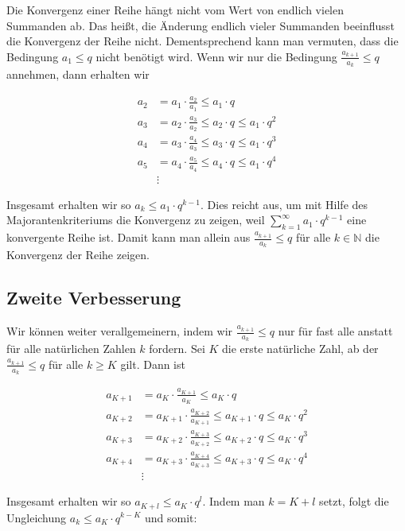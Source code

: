 \documentclass[fontsize=9pt,
               parskip=half-,
               DIV=14,
               listof=chapterentry,
               tocflat]{scrbook}
\begin{document}
Die Konvergenz einer Reihe hängt nicht vom Wert von endlich vielen Summanden ab. Das heißt, die Änderung endlich vieler Summanden beeinflusst die Konvergenz der Reihe nicht. Dementsprechend kann man vermuten, dass die Bedingung $a_{1}\leq q$ nicht benötigt wird. Wenn wir nur die Bedingung ${\tfrac {a_{k+1}}{a_{k}}}\leq q$ annehmen, dann erhalten wir

\begin{align*}
a_{2}&=a_{1}\cdot {\frac {a_{2}}{a_{1}}}\leq a_{1}\cdot q\\a_{3}&=a_{2}\cdot {\frac {a_{3}}{a_{2}}}\leq a_{2}\cdot q\leq a_{1}\cdot q^{2}\\a_{4}&=a_{3}\cdot {\frac {a_{4}}{a_{3}}}\leq a_{3}\cdot q\leq a_{1}\cdot q^{3}\\a_{5}&=a_{4}\cdot {\frac {a_{5}}{a_{4}}}\leq a_{4}\cdot q\leq a_{1}\cdot q^{4}\\&\vdots 
\end{align*}

Insgesamt erhalten wir so $a_{k}\leq a_{1}\cdot q^{k-1}$. Dies reicht aus, um mit Hilfe des Majorantenkriteriums die Konvergenz zu zeigen, weil $\sum _{k=1}^{\infty }a_{1}\cdot q^{k-1}$ eine konvergente Reihe ist. Damit kann man allein aus ${\frac {a_{k+1}}{a_{k}}}\leq q$ für alle $k\in \mathbb {N} $ die Konvergenz der Reihe zeigen.

\subsection{Zweite Verbesserung}

Wir können weiter verallgemeinern, indem wir ${\tfrac {a_{k+1}}{a_{k}}}\leq q$ nur für fast alle anstatt für alle natürlichen Zahlen $k$ fordern. Sei $K$ die erste natürliche Zahl, ab der ${\tfrac {a_{k+1}}{a_{k}}}\leq q$ für alle $k\geq K$ gilt. Dann ist

\begin{align*}
a_{K+1}&=a_{K}\cdot {\frac {a_{K+1}}{a_{K}}}\leq a_{K}\cdot q\\[0.5em]a_{K+2}&=a_{K+1}\cdot {\frac {a_{K+2}}{a_{K+1}}}\leq a_{K+1}\cdot q\leq a_{K}\cdot q^{2}\\[0.5em]a_{K+3}&=a_{K+2}\cdot {\frac {a_{K+3}}{a_{K+2}}}\leq a_{K+2}\cdot q\leq a_{K}\cdot q^{3}\\[0.5em]a_{K+4}&=a_{K+3}\cdot {\frac {a_{K+4}}{a_{K+3}}}\leq a_{K+3}\cdot q\leq a_{K}\cdot q^{4}\\[0.5em]&\vdots 
\end{align*}

Insgesamt erhalten wir so $a_{K+l}\leq a_{K}\cdot q^{l}$. Indem man $k=K+l$ setzt, folgt die Ungleichung $a_{k}\leq a_{K}\cdot q^{k-K}$ und somit:
\end{document}
